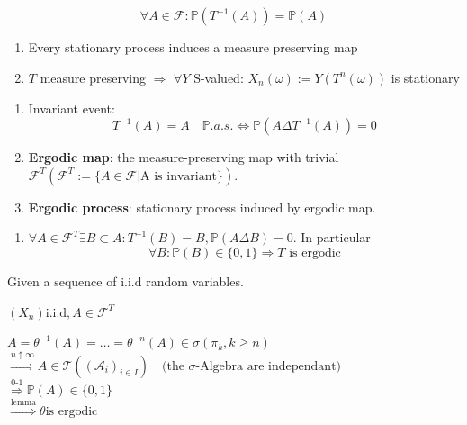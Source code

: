  \begin{definition}\quad
 \begin{equation*}
 	\forall A \in \mathcal{F}: \mathbb{P}(T^{-1}(A)) = \mathbb{P}(A) 
 \end{equation*}
 \end{definition}
 
 \begin{lemma}\quad
 \begin{enumerate}
 	\item Every stationary process induces a measure preserving map
 	\item $T$ measure preserving $\Rightarrow$ $\forall Y$ S-valued: $X_n(\omega) := Y(T^n(\omega))$ is stationary
 \end{enumerate}
 \end{lemma}
 
 \begin{definition}\quad
 \begin{enumerate}
 	\item Invariant event:
 	\begin{equation*}
 		T^{-1}(A) = A \quad \mathbb{P}. a.s. \Leftrightarrow \mathbb{P}(A \Delta T^{-1}(A)) = 0
 	\end{equation*}
 	\item \textbf{Ergodic map}: the measure-preserving map with trivial $\mathcal{F}^T(\mathcal{F}^T:= \{A \in \mathcal{F}| \text{A is invariant} \})$.
 	\item \textbf{Ergodic process}: stationary process induced by ergodic map.
 \end{enumerate}
 \end{definition}
 
 \begin{lemma}\quad
 \begin{enumerate}
 	\item  $\forall A \in \mathcal{F}^T \exists B \subset A: T^{-1}(B) = B, \mathbb{P}(A \Delta B) = 0$. In particular
 	\begin{equation*}
 	\forall B: \mathbb{P}(B) \in \{0, 1\} \Rightarrow \text{$T$ is ergodic}
	\end{equation*}
 \end{enumerate}
 \end{lemma}
 
 \begin{example}
 Given a sequence of i.i.d random variables.\par
 $(X_n) \text{i.i.d}, A \in \mathcal{F}^T$\par
 $A = \theta^{-1}(A) = \dots = \theta^{-n}(A) \in \sigma(\pi_k, k \geq n)$\\
 $\overset{n \uparrow \infty}{\Rightarrow} A \in \mathcal{T}((\mathcal{A}_i)_{i \in I}) \quad \text{(the $\sigma$-Algebra are independant)}$\\
 $\overset{\text{0-1}}{\Rightarrow} \mathbb{P}(A) \in \{0, 1\}$\\
 $\overset{\text{lemma}}{\Rightarrow} \theta \text{is ergodic}$

 \end{example}

